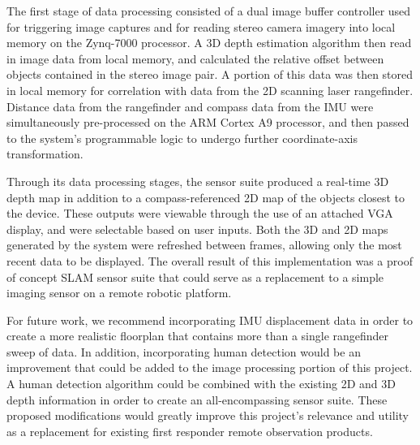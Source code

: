 \par
The first stage of data processing consisted of a dual image buffer controller used for triggering image captures and for reading stereo camera imagery into local memory on the Zynq-7000 processor. A 3D depth estimation algorithm then read in image data from local memory, and calculated the relative offset between objects contained in the stereo image pair. A portion of this data was then stored in local memory for correlation with data from the 2D scanning laser rangefinder. Distance data from the rangefinder and compass data from the IMU were simultaneously pre-processed on the ARM Cortex A9 processor, and then passed to the system's programmable logic to undergo further coordinate-axis transformation. 
\par
Through its data processing stages, the sensor suite produced a real-time 3D depth map in addition to a compass-referenced 2D map of the objects closest to the device. These outputs were viewable through the use of an attached VGA display, and were selectable based on user inputs. Both the 3D and 2D maps generated by the system were refreshed between frames, allowing only the most recent data to be displayed. The overall result of this implementation was a proof of concept SLAM sensor suite that could serve as a replacement to a simple imaging sensor on a remote robotic platform.
\par
For future work, we recommend incorporating IMU displacement data in order to create a more realistic floorplan that contains more than a single rangefinder sweep of data. In addition, incorporating human detection would be an improvement that could be added to the image processing portion of this project. A human detection algorithm could be combined with the existing 2D and 3D depth information in order to create an all-encompassing sensor suite. These proposed modifications would greatly improve this project's relevance and utility as a replacement for existing first responder remote observation products.





